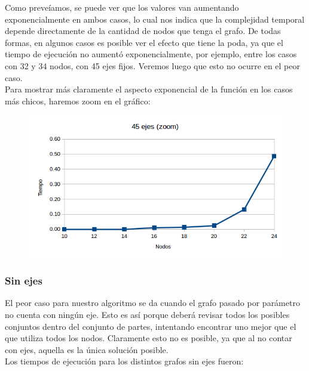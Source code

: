 Como preve\'iamos, se puede ver que los valores van aumentando exponencialmente en ambos casos, lo cual nos indica que la complejidad temporal depende directamente de la cantidad de nodos que tenga
el grafo.
De todas formas, en algunos casos es posible ver el efecto que tiene la poda, ya que el tiempo de ejecuci\'on no aument\'o exponencialmente, por ejemplo, entre los casos con 32 y 34 nodos, con 45 ejes fijos.
Veremos luego que esto no ocurre en el peor caso.\\

Para mostrar m\'as claramente el aspecto exponencial de la funci\'on en los casos m\'as chicos, haremos zoom en el gr\'afico:\\

\begin{figure}[h!]
   \begin{center}
 	\includegraphics[scale=0.7]{imagenes/exacto/45Ejes(zoom).png}
   \end{center}
 \end{figure}

\subsubsection{Sin ejes}
El peor caso para nuestro algoritmo se da cuando el grafo pasado por par\'ametro no cuenta con ning\'un eje. Esto es as\'i porque deber\'a revisar todos los posibles conjuntos dentro del conjunto de partes,
intentando encontrar uno mejor que el que utiliza todos los nodos. Claramente esto no es posible, ya que al no contar con ejes, aquella es la \'unica soluci\'on posible.\\

Los tiempos de ejecuci\'on para los distintos grafos sin ejes fueron:\\

